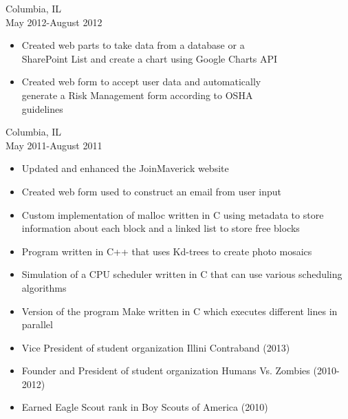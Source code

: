 \documentclass[11pt]{article}
\begin{document}
     \hfill Columbia, IL\\
     \hfill May 2012-August 2012
    \begin{itemize}[noitemsep,topsep=0pt,leftmargin=52pt]
      \item Created web parts to take data from a database or a\\
        SharePoint List and create a chart using Google Charts API
      \item Created web form to accept user data and automatically\\
        generate a Risk Management form according to OSHA\\
        guidelines
    \end{itemize}
    \medskip

     \hfill Columbia, IL\\
     \hfill May 2011-August 2011
    \begin{itemize}[noitemsep,topsep=0pt,leftmargin=52pt]
      \item Updated and enhanced the JoinMaverick website
      \item Created web form used to construct an email from user input
    \end{itemize}

  \bigskip
  \bigskip

  \begin{itemize}[noitemsep,topsep=0pt]
    \item Custom implementation of malloc written in C using metadata to store information about each block and a linked list to store free blocks
    \item Program written in C++ that uses Kd-trees to create photo mosaics
    \item Simulation of a CPU scheduler written in C that can use various scheduling algorithms
    \item Version of the program Make written in C which executes different lines in parallel
  \end{itemize}

  \bigskip
  \bigskip

  \begin{itemize}[noitemsep,topsep=0pt]
    \item Vice President of student organization Illini Contraband \hfill (2013)
    \item Founder and President of student organization Humans Vs. Zombies \hfill (2010-2012)
    \item Earned Eagle Scout rank in Boy Scouts of America \hfill (2010)
  \end{itemize}
\end{document}
